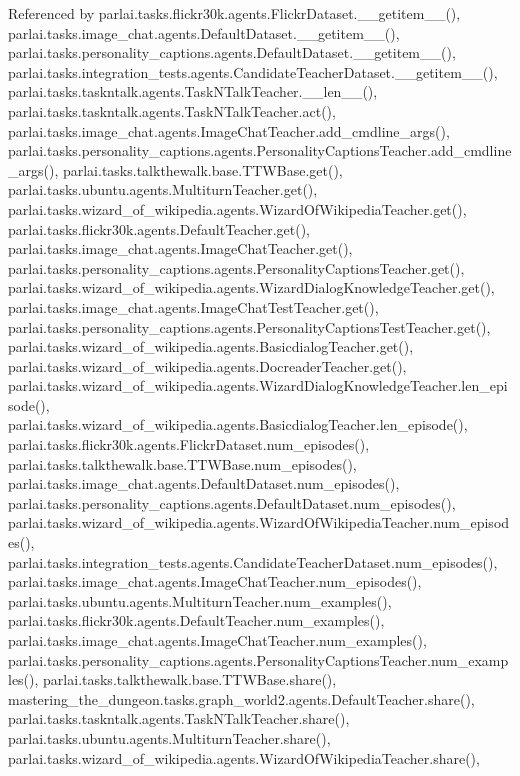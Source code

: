 Referenced by parlai.\+tasks.\+flickr30k.\+agents.\+Flickr\+Dataset.\+\_\+\+\_\+getitem\+\_\+\+\_\+(), parlai.\+tasks.\+image\+\_\+chat.\+agents.\+Default\+Dataset.\+\_\+\+\_\+getitem\+\_\+\+\_\+(), parlai.\+tasks.\+personality\+\_\+captions.\+agents.\+Default\+Dataset.\+\_\+\+\_\+getitem\+\_\+\+\_\+(), parlai.\+tasks.\+integration\+\_\+tests.\+agents.\+Candidate\+Teacher\+Dataset.\+\_\+\+\_\+getitem\+\_\+\+\_\+(), parlai.\+tasks.\+taskntalk.\+agents.\+Task\+N\+Talk\+Teacher.\+\_\+\+\_\+len\+\_\+\+\_\+(), parlai.\+tasks.\+taskntalk.\+agents.\+Task\+N\+Talk\+Teacher.\+act(), parlai.\+tasks.\+image\+\_\+chat.\+agents.\+Image\+Chat\+Teacher.\+add\+\_\+cmdline\+\_\+args(), parlai.\+tasks.\+personality\+\_\+captions.\+agents.\+Personality\+Captions\+Teacher.\+add\+\_\+cmdline\+\_\+args(), parlai.\+tasks.\+talkthewalk.\+base.\+T\+T\+W\+Base.\+get(), parlai.\+tasks.\+ubuntu.\+agents.\+Multiturn\+Teacher.\+get(), parlai.\+tasks.\+wizard\+\_\+of\+\_\+wikipedia.\+agents.\+Wizard\+Of\+Wikipedia\+Teacher.\+get(), parlai.\+tasks.\+flickr30k.\+agents.\+Default\+Teacher.\+get(), parlai.\+tasks.\+image\+\_\+chat.\+agents.\+Image\+Chat\+Teacher.\+get(), parlai.\+tasks.\+personality\+\_\+captions.\+agents.\+Personality\+Captions\+Teacher.\+get(), parlai.\+tasks.\+wizard\+\_\+of\+\_\+wikipedia.\+agents.\+Wizard\+Dialog\+Knowledge\+Teacher.\+get(), parlai.\+tasks.\+image\+\_\+chat.\+agents.\+Image\+Chat\+Test\+Teacher.\+get(), parlai.\+tasks.\+personality\+\_\+captions.\+agents.\+Personality\+Captions\+Test\+Teacher.\+get(), parlai.\+tasks.\+wizard\+\_\+of\+\_\+wikipedia.\+agents.\+Basicdialog\+Teacher.\+get(), parlai.\+tasks.\+wizard\+\_\+of\+\_\+wikipedia.\+agents.\+Docreader\+Teacher.\+get(), parlai.\+tasks.\+wizard\+\_\+of\+\_\+wikipedia.\+agents.\+Wizard\+Dialog\+Knowledge\+Teacher.\+len\+\_\+episode(), parlai.\+tasks.\+wizard\+\_\+of\+\_\+wikipedia.\+agents.\+Basicdialog\+Teacher.\+len\+\_\+episode(), parlai.\+tasks.\+flickr30k.\+agents.\+Flickr\+Dataset.\+num\+\_\+episodes(), parlai.\+tasks.\+talkthewalk.\+base.\+T\+T\+W\+Base.\+num\+\_\+episodes(), parlai.\+tasks.\+image\+\_\+chat.\+agents.\+Default\+Dataset.\+num\+\_\+episodes(), parlai.\+tasks.\+personality\+\_\+captions.\+agents.\+Default\+Dataset.\+num\+\_\+episodes(), parlai.\+tasks.\+wizard\+\_\+of\+\_\+wikipedia.\+agents.\+Wizard\+Of\+Wikipedia\+Teacher.\+num\+\_\+episodes(), parlai.\+tasks.\+integration\+\_\+tests.\+agents.\+Candidate\+Teacher\+Dataset.\+num\+\_\+episodes(), parlai.\+tasks.\+image\+\_\+chat.\+agents.\+Image\+Chat\+Teacher.\+num\+\_\+episodes(), parlai.\+tasks.\+ubuntu.\+agents.\+Multiturn\+Teacher.\+num\+\_\+examples(), parlai.\+tasks.\+flickr30k.\+agents.\+Default\+Teacher.\+num\+\_\+examples(), parlai.\+tasks.\+image\+\_\+chat.\+agents.\+Image\+Chat\+Teacher.\+num\+\_\+examples(), parlai.\+tasks.\+personality\+\_\+captions.\+agents.\+Personality\+Captions\+Teacher.\+num\+\_\+examples(), parlai.\+tasks.\+talkthewalk.\+base.\+T\+T\+W\+Base.\+share(), mastering\+\_\+the\+\_\+dungeon.\+tasks.\+graph\+\_\+world2.\+agents.\+Default\+Teacher.\+share(), parlai.\+tasks.\+taskntalk.\+agents.\+Task\+N\+Talk\+Teacher.\+share(), parlai.\+tasks.\+ubuntu.\+agents.\+Multiturn\+Teacher.\+share(), parlai.\+tasks.\+wizard\+\_\+of\+\_\+wikipedia.\+agents.\+Wizard\+Of\+Wikipedia\+Teacher.\+share(), 